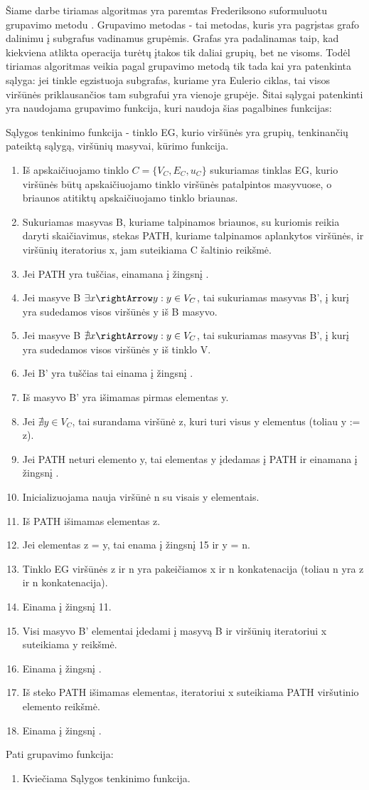 Šiame darbe tiriamas algoritmas yra paremtas Frederiksono suformuluotu grupavimo metodu \cite{DSfUoMST}. Grupavimo metodas - tai metodas, kuris yra pagrįstas grafo dalinimu į subgrafus vadinamus grupėmis. Grafas yra padalinamas taip, kad kiekviena atlikta operacija turėtų įtakos tik daliai grupių, bet ne visoms. Todėl tiriamas algoritmas veikia pagal grupavimo metodą tik tada kai yra patenkinta sąlyga: jei tinkle egzistuoja subgrafas, kuriame yra Eulerio ciklas, tai visos viršūnės priklausančios tam subgrafui yra vienoje grupėje. Šitai sąlygai patenkinti yra naudojama grupavimo funkcija, kuri naudoja šias pagalbines funkcijas:

Sąlygos tenkinimo funkcija - tinklo EG, kurio viršūnės yra grupių, tenkinančių pateiktą sąlygą, viršūnių masyvai, kūrimo funkcija.
\begin{enumerate}
	\item Iš apskaičiuojamo tinklo $C=\{V_C, E_C, u_C\}$ sukuriamas tinklas EG, kurio viršūnės būtų apskaičiuojamo tinklo viršūnės patalpintos masyvuose, o briaunos atitiktų apskaičiuojamo tinklo briaunas.
	\item Sukuriamas masyvas B, kuriame talpinamos briaunos, su kuriomis reikia daryti skaičiavimus, stekas PATH, kuriame talpinamos aplankytos viršūnės, ir viršūnių iteratorius x, jam suteikiama C šaltinio reikšmė.
	\item Jei PATH yra tuščias, einamana į žingsnį .
	\item Jei masyve B $\exists x \rightArrow y : y \in V_C$, tai sukuriamas masyvas B', į kurį yra sudedamos visos viršūnės y iš B masyvo.
	\item Jei masyve B $\nexists x \rightArrow y : y \in V_C$, tai sukuriamas masyvas B', į kurį yra sudedamos visos viršūnės y iš tinklo V.
	\item Jei B' yra tuščias tai einama į žingsnį .
	\item Iš masyvo B' yra išimamas pirmas elementas y.
	\item Jei $\nexists y \in V_C$, tai surandama viršūnė z, kuri turi visus y elementus (toliau y := z).
	\item Jei PATH neturi elemento y, tai elementas y įdedamas į PATH ir einamana į žingsnį .
	\item Inicializuojama nauja viršūnė n su visais y elementais.
	\item Iš PATH išimamas elementas z.
	\item Jei elementas z = y, tai enama į žingsnį 15 ir y = n.
	\item  Tinklo EG viršūnės z ir n yra pakeičiamos x ir n konkatenacija (toliau n yra z ir n konkatenacija).
	\item  Einama į žingsnį 11.
	\item  Visi masyvo B' elementai įdedami į masyvą B ir viršūnių iteratoriui x suteikiama y reikšmė.
	\item  Einama į žingsnį .
	\item  Iš steko PATH išimamas elementas, iteratoriui x suteikiama PATH viršutinio elemento reikšmė.
	\item  Einama į žingsnį .
\end{enumerate}

Pati grupavimo funkcija:
\begin{enumerate}
	\item Kviečiama Sąlygos tenkinimo funkcija.
\end{enumerate}
